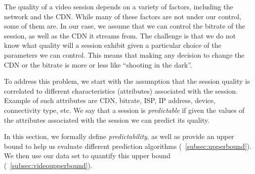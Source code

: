 \label{predictability}


The quality of a video session depends on a variety of factors,
including the network and the CDN. While many of these factors are not
under our control, some of them are. In our case, we assume that we
can control the bitrate of the session, as well as the CDN it streams
from. The challenge is that we do not know what quality will a session
exhibit given a particular choice of the parameters we can
control. This means that making any decision to change the CDN or the
bitrate is more or less like ``shooting in the dark''.

To address this problem, we start with the assumption that the session
quality is correlated to different characteristics (attributes)
associated with the session. Example of such attributes are CDN,
bitrate, ISP, IP address, device, connectivity type, etc. We say that
a session is {\it predictable} if given the values of the attributes
associated with the session we can predict its quality. 

In this section, we formally define {\it predictability}, as well as
provide an upper bound to help us evaluate different prediction
algorithms (\Section~\ref{subsec:upperbound}). We then use our data
set to quantify this upper bound
(\Section~\ref{subsec:videoupperbound}).





